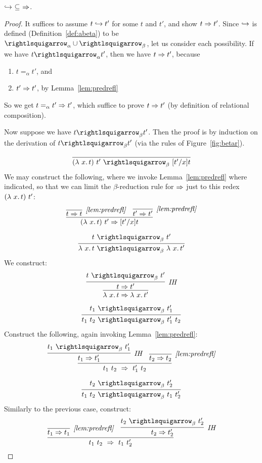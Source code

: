\begin{lemma}
  \label{lem:betapar}
  $\hookrightarrow\ \subseteq\ \Rightarrow$.
\end{lemma}
\begin{proof}
  It suffices to assume $t \hookrightarrow t'$ for some $t$ and $t'$,
  and show $t \Rightarrow t'$.  Since $\hookrightarrow$ is defined (Definition~\ref{def:abeta}) to be $\curva_\alpha \cup \curva_\beta$,
  let us consider each possibility.  If we have $t \curva_\alpha t'$, then we have $t \Rightarrow t'$, because 
  \begin{enumerate}
  \item $t =_\alpha t'$, and
  \item $t' \Rightarrow t'$, by Lemma~\ref{lem:predrefl}
  \end{enumerate}
  \noindent So we get $t =_\alpha t' \Rightarrow t'$, which suffice to prove $t \Rightarrow t'$ (by definition of relational composition).

  Now suppose we have $t \curva_\beta t'$.  Then the proof is by
  induction on the derivation of $t \curva_\beta t'$ (via the rules of
  Figure~\ref{fig:betar}).

  \case{ }
  \[
  \infer{(\lam{x}{t})\ t'\ \curva_\beta\ [t'/x]t}{\ }
  \]
  \noindent We may construct the following, where we invoke Lemma~\ref{lem:predrefl} where indicated, so that we can limit
  the $\beta$-reduction rule for $\Rightarrow$ just to this redex $(\lambda\ x.\, t)\ t'$:
  \[
  \infer{(\lam{x}{t})\ t' \Pred [t'/x]t}
        {\infer[\textit{\ref{lem:predrefl}}]{t \Pred t}{\ } & \infer[\textit{\ref{lem:predrefl}}]{t' \Pred t'}{\ }}
  \]
        

  \case{ }
  \[
  \infer{\lam{x}{t}\ \curva_\beta\ \lam{x}{t'}}{t\ \curva_\beta\ t'}
  \]
  \noindent We construct:
  \[
  \infer{\lam{x}{t} \Pred \lam{x}{t'}}{\infer[\textit{IH}]{t \Pred t'}{t\ \curva_\beta\ t'}}
  \]

  \case{ }
  \[
  \infer{t_1\ t_2\ \curva_\beta\ t_1'\ t_2}{t_1\ \curva_\beta\ t_1'}
  \]
  \noindent Construct the following, again invoking Lemma~\ref{lem:predrefl}:
  \[
  \infer{t_1\ t_2\ \Pred\ t_1'\ t_2}{\infer[\textit{IH}]{t_1 \Pred t_1'}{t_1\ \curva_\beta\ t_1'} &
                                    \infer[\textit{\ref{lem:predrefl}}]{t_2 \Pred t_2}{\ }}
  \]

  \case{ }
  \[
  \infer{t_1\ t_2\ \curva_\beta\ t_1\ t_2'}{t_2\ \curva_\beta\ t_2'}
  \]
  \noindent Similarly to the previous case, construct:
  \[
  \infer{t_1\ t_2\ \Pred\ t_1\ t_2'}{\infer[\textit{\ref{lem:predrefl}}]{t_1 \Pred t_1}{\ }&
                                    \infer[\textit{IH}]{t_2 \Pred t_2'}{t_2\ \curva_\beta\ t_2'} }
  \]
  
        
  \end{proof}

